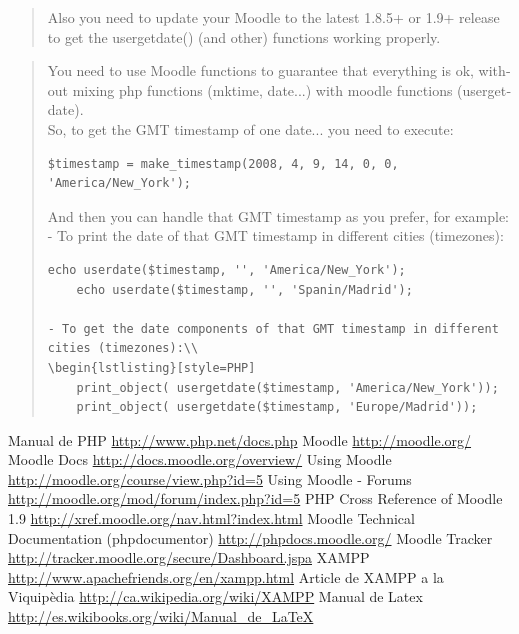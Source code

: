 \documentclass[a4paper]{report}  %
\begin{document}
\begin{otherlanguage}{english}
\begin{quote}
Also you need to update your Moodle to the latest 1.8.5+ or 1.9+ release to get the usergetdate() (and other) functions working properly.\\
\end{quote}
\begin{quote}
You need to use Moodle functions to guarantee that everything is ok, without mixing php functions (mktime, date...) with moodle functions (usergetdate).\\

So, to get the GMT timestamp of one date... you need to execute: \\
\begin{lstlisting}[style=PHP]
$timestamp = make_timestamp(2008, 4, 9, 14, 0, 0, 'America/New_York');
\end{lstlisting}
And then you can handle that GMT timestamp as you prefer, for example:\\

- To print the date of that GMT timestamp in different cities (timezones):
\begin{lstlisting}[style=PHP]
    echo userdate($timestamp, '', 'America/New_York');
    echo userdate($timestamp, '', 'Spanin/Madrid');

- To get the date components of that GMT timestamp in different cities (timezones):\\
\begin{lstlisting}[style=PHP]
    print_object( usergetdate($timestamp, 'America/New_York'));
    print_object( usergetdate($timestamp, 'Europe/Madrid'));
\end{lstlisting}
\end{quote}
\end{otherlanguage}

\begin{thebibliography}{11} 
 Manual de PHP \url{http://www.php.net/docs.php}
 Moodle \url{http://moodle.org/}
 Moodle Docs \url{http://docs.moodle.org/overview/}
 Using Moodle \url{http://moodle.org/course/view.php?id=5}
 Using Moodle - Forums \url{http://moodle.org/mod/forum/index.php?id=5}
 PHP Cross Reference of Moodle 1.9 \url{http://xref.moodle.org/nav.html?index.html}
 Moodle Technical Documentation (phpdocumentor) \url{http://phpdocs.moodle.org/}
 Moodle Tracker \url{http://tracker.moodle.org/secure/Dashboard.jspa}
 XAMPP \url{http://www.apachefriends.org/en/xampp.html}
 Article de XAMPP a la Viquipèdia \url{http://ca.wikipedia.org/wiki/XAMPP}
 Manual de Latex \url{http://es.wikibooks.org/wiki/Manual_de_LaTeX}
\end{thebibliography}
\end{document}
